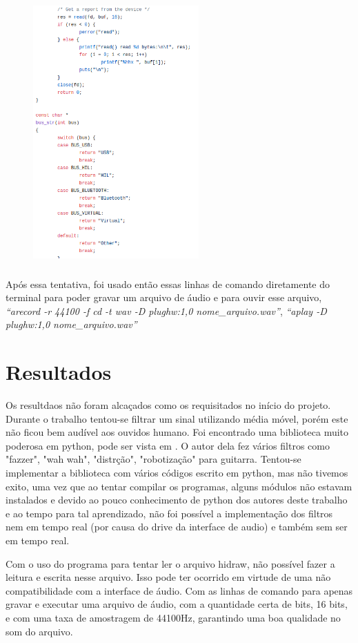 \documentclass[conference]{IEEEtran}
\begin{document}
\begin{figure}[!htb]
\centering
\includegraphics[width=2.5in, height=4in]{Imagens/hid5}
\end{figure}

Após essa tentativa, foi usado então essas linhas de comando diretamente do terminal para poder gravar um arquivo de áudio e para ouvir esse arquivo, \textit{``arecord -r 44100 -f cd -t wav -D plughw:1,0 nome\_arquivo.wav''}, \textit{``aplay -D plughw:1,0 nome\_arquivo.wav''}  


\section{Resultados}

Os resultdaos não foram alcaçados como os requisitados no início do projeto. Durante o trabalho tentou-se filtrar um sinal utilizando média móvel, porém este não ficou bem audível aos ouvidos humano.  Foi encontrado uma biblioteca muito poderosa em python, pode ser vista em \cite{audiolazy}. O autor dela fez vários filtros como "fazzer", "wah wah", "distrção", "robotização" para guitarra. Tentou-se implementar a biblioteca com vários códigos escrito em python, mas não tivemos exito, uma vez que ao tentar compilar os programas, alguns módulos não estavam instalados e devido ao pouco conhecimento de python dos autores deste trabalho e ao tempo para tal aprendizado, não foi possível a implementação dos filtros nem em tempo real (por causa do drive da interface de audio) e também sem ser em tempo real.

Com o uso do programa para tentar ler o arquivo hidraw, não possível fazer a leitura e escrita nesse arquivo. Isso pode ter ocorrido em virtude de uma não compatibilidade com a interface de áudio. Com as linhas de comando para apenas gravar e executar uma arquivo de áudio, com a quantidade certa de bits, 16 bits, e com uma taxa de amostragem de 44100Hz, garantindo uma boa qualidade no som do arquivo.
\end{document}
